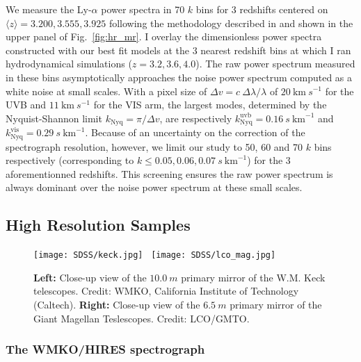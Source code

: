 We measure the Ly-$\alpha$ power spectra in 70 $k$ bins for 3 redshifts centered on $\langle z \rangle = 3.200, 3.555, 3.925$ following the methodology described in \cite{Yeche17} and shown in the upper panel of Fig.~\ref{fig:hr_mr}. I overlay the dimensionless power spectra constructed with our best fit models at the 3 nearest redshift bins at which I ran hydrodynamical simulations ($z=3.2, 3.6, 4.0$). The raw power spectrum measured in these bins asymptotically approaches the noise power spectrum computed as a white noise at small scales. With a pixel size of $\Delta v = c~ \Delta \lambda / \lambda$ of $20~ \mathrm{km}~s^{-1}$ for the UVB and $11~ \mathrm{km}~s^{-1}$ for the VIS arm, the largest modes, determined by the Nyquist-Shannon limit $k_{\mathrm{Nyq}} = \pi / \Delta v$, are respectively $k_{\mathrm{Nyq}}^{\mathrm{uvb}} = 0.16~s~\mathrm{km}^{-1}$ and $k_{\mathrm{Nyq}}^{\mathrm{vis}} = 0.29~s~\mathrm{km}^{-1}$. Because of an uncertainty on the correction of the spectrograph resolution, however, we limit our study to 50, 60 and 70 $k$ bins respectively (corresponding to $k \leq 0.05, 0.06, 0.07~s~\mathrm{km}^{-1}$) for the 3 aforementionned redshifts. This screening ensures the raw power spectrum is always dominant over the noise power spectrum at these small scales. 


\subsection{High Resolution Samples}


\begin{figure}[!]
\begin{center}
\texttt{[image: SDSS/keck.jpg]}~%
\texttt{[image: SDSS/lco\_mag.jpg]}
\caption{\textbf{Left:} Close-up view of the $10.0~m$ primary mirror of the W.M. Keck telescopes. Credit: WMKO, California Institute of Technology (Caltech). \textbf{Right:} Close-up view of the $6.5~m$ primary mirror of the Giant Magellan Teslescopes. Credit: LCO/GMTO.}
\label{fig:wmko_telescope}
\end{center}
\end{figure}

\subsubsection{The WMKO/HIRES spectrograph}

